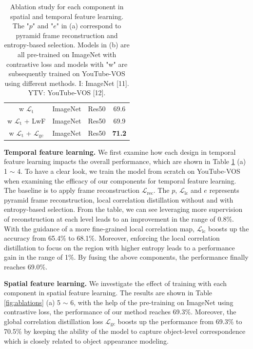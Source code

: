\documentclass{article}
\begin{document}
\begin{table}[t]
{{\begin{tabular}{@{}cccc@{}}
            w $\mathcal{L}_{\mathrm{t}}$    & ImageNet & Res50 &69.6          \\
            w $\mathcal{L}_{\mathrm{t}}$ + LwF            & ImageNet & Res50 &69.9          \\
            w $\mathcal{L}_{\mathrm{t}}$ + $\mathcal{L}_{\mathrm{gc}}$ & ImageNet & Res50 &\textbf{71.2} \\ 
            \hline
            \end{tabular}%
            }
          }
    \captionsetup{font=small}
    \caption{Ablation study for each component in spatial and temporal feature learning.  The "$p$" and "$e$" in (a) correspond to pyramid frame reconstruction and entropy-based selection. Models in (b) are all pre-trained on ImageNet with contrastive loss and models with "w" are subsequently trained on YouTube-VOS using different methods. I: ImageNet [11].  YTV: YouTube-VOS [12].}
    \label{tab:ablations}\vspace{-6mm}
\end{table}

\textbf{Temporal feature learning.} We first examine how each design in temporal feature learning impacts the overall performance, which are shown in Table \ref{tab:ablations} (a) 1 $\sim$ 4. To have a clear look, we train the model from scratch on YouTube-VOS when examining the efficacy of our components for temporal feature learning. The baseline is to apply frame reconstruction $\mathcal{L}_{\mathrm{rec}}$. The $p$, $\mathcal{L}_{\mathrm{lc}}$ and $e$ represents pyramid frame reconstruction, local correlation distillation without and with entropy-based selection. From the table, we can see leveraging more supervision of reconstruction at each level leads to an improvement in the range of 0.8\%. With the guidance of a more fine-grained local correlation map, $\mathcal{L}_{\mathrm{lc}}$ boosts up the accuracy from 65.4\% to 68.1\%. Moreover, enforcing the local correlation distillation to focus on the region with higher entropy leads to a performance gain in the range of 1\%. By fusing the above components, the performance finally reaches 69.0\%.

\textbf{Spatial feature learning.} We investigate the effect of training with each component in spatial feature learning. The results are shown in Table \ref{fig:ablations} (a) 5 $\sim$ 6, with the help of the pre-training on ImageNet using contrastive loss, the performance of our method reaches 69.3\%. Moreover, the global correlation distillation loss $\mathcal{L}_{\mathrm{gc}}$ boosts up the performance from 69.3\% to 70.5\% by keeping the ability of the model to capture object-level correspondence which is closely related to object appearance modeling.
\end{document}
